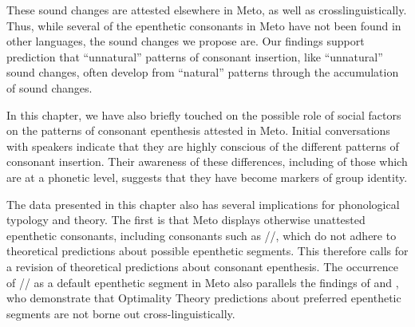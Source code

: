 \documentclass[output=paper]{langscibook}
\begin{document}
\begin{exe}
	\label{ex:EpeFroVow2}
	\label{ex:EpeBacVow2}
\end{exe}

These sound changes are attested elsewhere in Meto, as well as crosslinguistically.
Thus, while several of the epenthetic consonants in Meto have not been
found in other languages, the sound changes we propose are.
Our findings support  prediction
that ``unnatural'' patterns  of consonant 
insertion, like ``unnatural'' sound changes, often develop from ``natural'' patterns
through the accumulation of sound changes.
 
In this chapter, we have also briefly touched on  the possible role of social factors 
on the patterns of consonant epenthesis attested in Meto. Initial 
conversations with speakers indicate that they are highly conscious of the different 
patterns of consonant insertion. Their awareness of these differences, including of those which
are at a phonetic level,
suggests that they have become  markers of group identity.

The data presented in this chapter also has several implications 
for phonological typology and theory. The first is that Meto displays 
otherwise unattested epenthetic consonants,
including consonants such as /\gw/,
which do not adhere to theoretical predictions about 
possible epenthetic segments.
This therefore calls for a revision of
theoretical predictions about consonant epenthesis.
The occurrence of /\gw/ as a default epenthetic segment in Meto also parallels
the findings of \citet{mo15} and \citet{vasa17},
who demonstrate that Optimality Theory predictions about
preferred epenthetic segments are not borne out cross-linguistically. 
\end{document}
